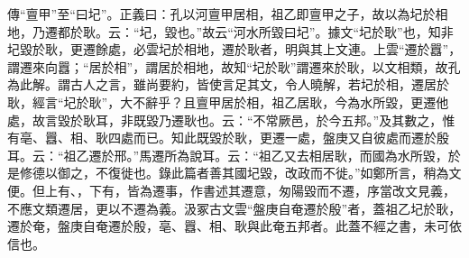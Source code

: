 {\noindent\zhuan{}\fzbyks 傳“亶甲”至“曰圮”。正義曰：孔以河亶甲居相，祖乙即亶甲之子，故以為圮於相地，乃遷都於耿。云：“圮，毀也。”故云“河水所毀曰圮”。據文“圮於耿”也，知非圮毀於耿，更遷餘處，必雲圮於相地，遷於耿者，明與其上文連。上雲“遷於囂”，謂遷來向囂；“居於相”，謂居於相地，故知“圮於耿”謂遷來於耿，以文相類，故孔為此解。謂古人之言，雖尚要約，皆使言足其文，令人曉解，若圮於相，遷居於耿，經言“圮於耿”，大不辭乎？且亶甲居於相，祖乙居耿，今為水所毀，更遷他處，故言毀於耿耳，非既毀乃遷耿也。云：“不常厥邑，於今五邦。”及其數之，惟有亳、囂、相、耿四處而已。知此既毀於耿，更遷一處，盤庚又自彼處而遷於殷耳。云：“祖乙遷於邢。”馬遷所為說耳。云：“祖乙又去相居耿，而國為水所毀，於是修德以御之，不復徙也。錄此篇者善其國圮毀，改政而不徙。”如鄭所言，稍為文便。但上有、，下有，皆為遷事，作書述其遷意，匆陽毀而不遷，序當改文見義，不應文類遷居，更以不遷為義。汲冢古文雲“盤庚自奄遷於殷”者，蓋祖乙圮於耿，遷於奄，盤庚自奄遷於殷，亳、囂、相、耿與此奄五邦者。此蓋不經之書，未可依信也。 \par}


